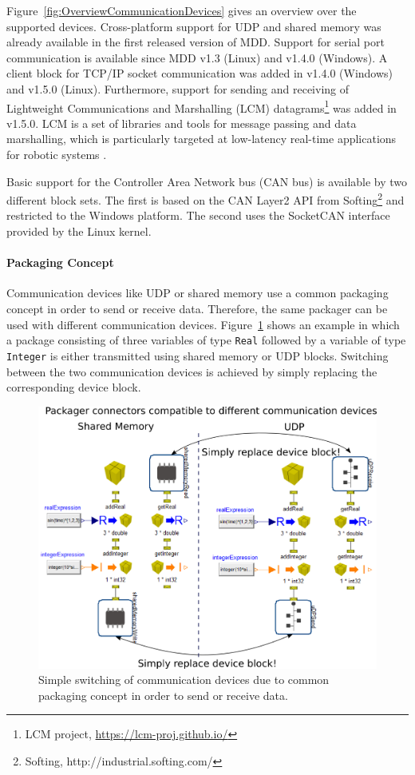 \documentclass{resources/modelica}
\newcommand{\modelica}[1]{\lstinline[language=modelica]|#1|}
\begin{document}
Figure~\ref{fig:OverviewCommunicationDevices} gives an overview over the
supported devices. Cross-platform support for UDP and shared memory was already
available in the first released version of MDD. Support for serial port communication is
available since MDD v1.3 (Linux) and v1.4.0 (Windows). A client block for TCP/IP
socket communication was added in v1.4.0 (Windows) and v1.5.0 (Linux).
Furthermore, support for sending and receiving of Lightweight Communications and
Marshalling (LCM) datagrams\footnote{LCM project,
\url{https://lcm-proj.github.io/}} was added in v1.5.0.
LCM is a set of libraries and tools for message passing and data marshalling,
which is particularly targeted at low-latency real-time applications for
robotic systems \citep{Huang2010}.

Basic support for the Controller Area Network bus (CAN bus) is available by two
different block sets. The first is based on the CAN Layer2 API from
Softing\footnote{Softing, http://industrial.softing.com/} and restricted to the
Windows platform. The second uses the SocketCAN
interface provided by the Linux kernel.

\paragraph{Packaging Concept}

Communication devices like UDP or shared memory use a common packaging concept
in order to send or receive data. Therefore, the same packager can be used with
different communication devices. Figure~\ref{fig:PackagingConcept} shows an
example in which a package consisting of three variables of type \modelica{Real}
followed by a variable of type \modelica{Integer} is either transmitted using
shared memory or UDP blocks. Switching between the two communication devices
is achieved by simply replacing the corresponding device block.
\begin{figure}[htb]
  \centering
  \includegraphics[width=1.0\columnwidth]{figures/PackagingConcept}
  \caption{Simple switching of communication devices due to common packaging concept
  in order to send or receive data.}
  \label{fig:PackagingConcept}
\end{figure}
\end{document}
